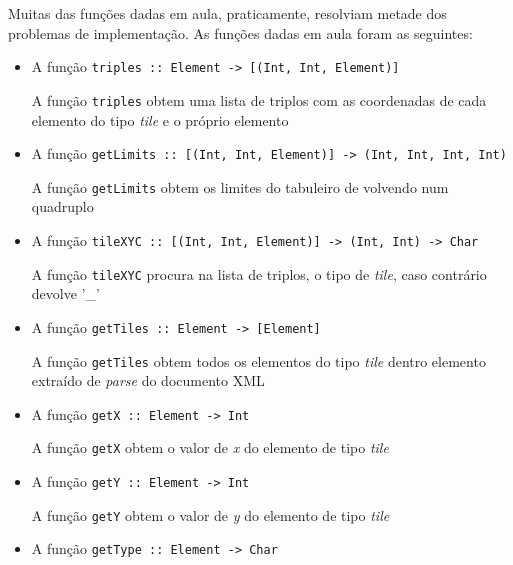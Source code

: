 Muitas das funções  dadas em aula, praticamente, resolviam metade dos problemas de  implementação. As funções
dadas em aula foram as seguintes:
\begin{itemize}

\item A função \texttt{triples ::  Element ->  [(Int,  Int,  Element)]}
\begin{description}
\item[A função \texttt{triples} obtem uma lista de triplos com as coordenadas de cada elemento do tipo \emph{tile} e o próprio elemento]
\end{description} 
\item A função \texttt{getLimits :: [(Int, Int, Element)] -> (Int, Int, Int, Int)}
    \begin{description}
\item[A função \texttt{getLimits} obtem os limites do tabuleiro de volvendo num quadruplo]
\end{description} 
\item A função \texttt{tileXYC ::  [(Int, Int, Element)] ->  (Int, Int) -> Char}
\begin{description}
\item[A função \texttt{tileXYC} procura na lista de triplos, o tipo de \emph{tile}, caso contrário devolve '\_']
\end{description}
\item A função \texttt{getTiles :: Element -> [Element]}
\begin{description}
\item[A função \texttt{getTiles} obtem todos os elementos do tipo \emph{tile} dentro elemento extraído de \emph{parse} do documento XML]
\end{description}
\item A função \texttt{getX ::  Element -> Int}
\begin{description}
\item[A função \texttt{getX} obtem o valor de \emph{x} do elemento de tipo \emph{tile}]
\end{description}
\item A função \texttt{getY :: Element ->  Int}
 \begin{description}
\item[A função \texttt{getY} obtem o valor de \emph{y} do elemento de tipo \emph{tile}]
\end{description}
\item A função \texttt{getType :: Element -> Char }
 \begin{description}

\end{description}
\end{itemize}
